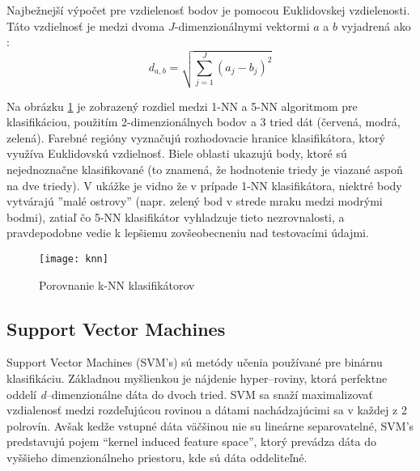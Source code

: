 Najbežnejší výpočet pre vzdielenosť bodov je pomocou Euklidovskej vzdielenosti.
Táto vzdielnosť je medzi dvoma $J$-dimenzionálnymi vektormi $a$ a $b$ vyjadrená ako \cite{prop:KnnClassification}:
\begin{equation}
    \label{eq:euclidMetric}
    d_{a,b} = \sqrt{\sum_{j=1}^{J}{(a_j - b_j)^2}}
\end{equation}

Na obrázku \ref{pic:kNN} je zobrazený rozdiel medzi 1-NN a 5-NN algoritmom pre klasifikáciou,
    použitím 2-dimenzionálnych bodov a 3 tried dát (červená, modrá, zelená).
Farebné regióny vyznačujú rozhodovacie hranice klasifikátora, ktorý využíva Euklidovskú vzdielnosť.
Biele oblasti ukazujú body, ktoré sú nejednoznačne klasifikované (to znamená, že hodnotenie triedy je viazané aspoň na dve triedy).
V ukážke je vidno že v prípade 1-NN klasifikátora, niektré body vytvárajú ''malé ostrovy''
    (napr. zelený bod v strede mraku medzi modrými bodmi), zatiaľ čo 5-NN klasifikátor vyhladzuje tieto nezrovnalosti,
    a pravdepodobne vedie k lepšiemu zovšeobecneniu nad testovacími údajmi.

\begin{figure}[H]
	\centering
	\texttt{[image: knn]}
	\caption{Porovnanie k-NN klasifikátorov\cite{odkaz:KnnImage}}
	\label{pic:kNN}
\end{figure}



\subsection{Support Vector Machines}
Support Vector Machines (SVM's) sú metódy učenia používané pre binárnu klasifikáciu.
Základnou myšlienkou je nájdenie hyper--roviny, ktorá perfektne oddelí \textit{d}--dimenzionálne dáta do dvoch tried\cite{prop:IntroductionToSVM}.
SVM sa snaží maximalizovať vzdialenosť medzi rozdeľujúcou rovinou a dátami nachádzajúcimi sa v každej z 2 polrovín\cite{prop:SupervisedMachineLearning}.
Avšak kedže vstupné dáta väčšinou nie su lineárne separovatelné, SVM's predstavujú pojem “kernel induced feature space”,
    ktorý prevádza dáta do vyššieho dimenzionálneho priestoru, kde sú dáta oddeliteľné.\cite{prop:IntroductionToSVM}

